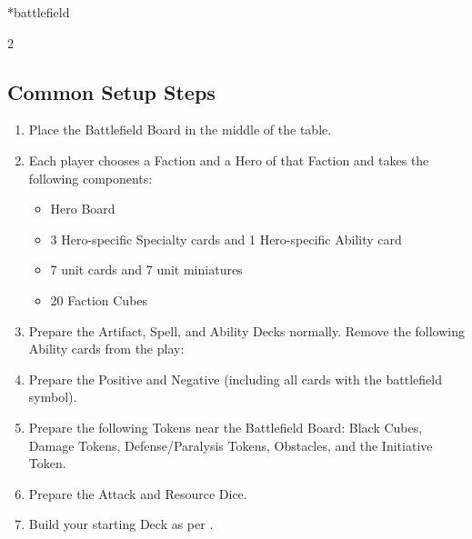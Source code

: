 \newpage
\begin{expansion}*{battlefield}
  \begin{multicols}{2}
    \subsection*{Common Setup Steps \hspace*{-1.6em}}
    \begin{enumerate}[leftmargin=1.5em]
      \item Place the Battlefield Board in the middle of the table.
      \item Each player chooses a Faction and a Hero of that Faction and takes the following components:
      \begin{itemize}
        \item[a)] Hero Board
        \item[b)] 3 Hero-specific Specialty cards and 1 Hero-specific Ability card
        \item[c)] 7 unit cards and 7 unit miniatures
        \item[d)] 20 Faction Cubes
      \end{itemize}
      \item Prepare the Artifact, Spell, and Ability Decks normally.
        Remove the following Ability cards from the play:  
      \item Prepare the Positive and Negative  (including all cards with the battlefield symbol).
      \item Prepare the following Tokens near the Battlefield Board: Black Cubes, Damage Tokens, Defense/Paralysis Tokens, Obstacles, and the Initiative Token.
      \item Prepare the Attack and Resource Dice.
      \item Build your starting Deck as per .
    \end{enumerate}
    \columnbreak


\end{multicols}
\end{expansion}
